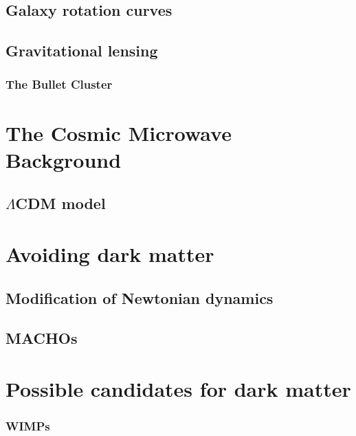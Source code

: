 \subsection{Galaxy rotation curves}\label{sec:DMOverview/RotationCurves}

\subsection{Gravitational lensing}\label{sec:DMOverview/GravLens}

\subsubsection{The Bullet Cluster}\label{sec:DMOverview/BulletCluster}

\section{The Cosmic Microwave Background}\label{sec:DMOverview/CMB}

\subsection{$\Lambda$CDM model}\label{sec:DMOverview/LambdaCDM}

\section{Avoiding dark matter}\label{sec:DMOverview/AvoidDM}

\subsection{Modification of Newtonian dynamics}\label{sec:DMOverview/MOND}

\subsection{MACHOs}\label{sec:DMOverview/MACHOs}

\section{Possible candidates for dark matter}\label{sec:DMOverview/Candidates4DM}

\subsubsection{WIMPs}\label{sec:DMOverview/WIMPs}

